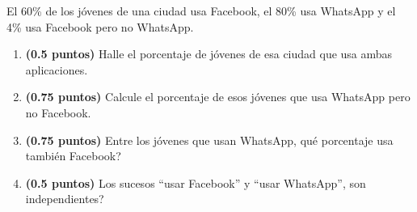 
El 60\% de los jóvenes de una ciudad usa Facebook, el 80\% usa WhatsApp y el 4\% usa Facebook pero no WhatsApp.
\begin{enumerate}[label=\alph*)]
\item \textbf{(0.5 puntos)} Halle el porcentaje de jóvenes de esa ciudad que usa ambas aplicaciones.
\item \textbf{(0.75 puntos)} Calcule el porcentaje de esos jóvenes que usa WhatsApp pero no Facebook.
\item \textbf{(0.75 puntos)} Entre los jóvenes que usan WhatsApp, \textquestiondown{}qué porcentaje usa también Facebook?
\item \textbf{(0.5 puntos)} Los sucesos ``usar Facebook'' y ``usar WhatsApp'', \textquestiondown{}son independientes?
\end{enumerate}
